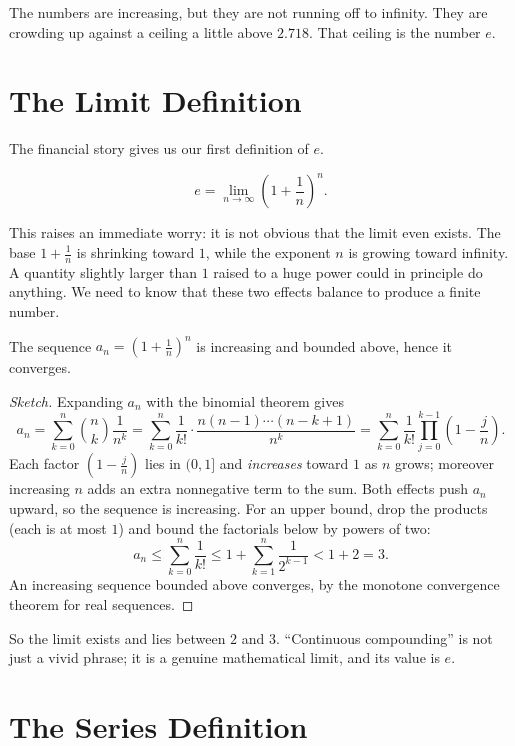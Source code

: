 \documentclass{essay}
\begin{document}
The numbers are increasing, but they are not running off to infinity. They are crowding up against a ceiling a little above $2.718$. That ceiling is the number $e$.

\section{The Limit Definition}

The financial story gives us our first definition of $e$.

\begin{definition}
\[
e = \lim_{n \to \infty} \left(1 + \frac{1}{n}\right)^n.
\]
\end{definition}

This raises an immediate worry: it is not obvious that the limit even exists. The base $1 + \tfrac{1}{n}$ is shrinking toward $1$, while the exponent $n$ is growing toward infinity. A quantity slightly larger than $1$ raised to a huge power could in principle do anything. We need to know that these two effects balance to produce a finite number.

\begin{proposition}
The sequence $a_n = \left(1 + \tfrac{1}{n}\right)^n$ is increasing and bounded above, hence it converges.
\end{proposition}

\begin{proof}[Sketch]
Expanding $a_n$ with the binomial theorem gives
\[
a_n = \sum_{k=0}^{n} \binom{n}{k}\frac{1}{n^k}
    = \sum_{k=0}^{n} \frac{1}{k!}\cdot\frac{n(n-1)\cdots(n-k+1)}{n^k}
    = \sum_{k=0}^{n} \frac{1}{k!}\prod_{j=0}^{k-1}\left(1 - \frac{j}{n}\right).
\]
Each factor $\left(1 - \tfrac{j}{n}\right)$ lies in $(0,1]$ and \emph{increases} toward $1$ as $n$ grows; moreover increasing $n$ adds an extra nonnegative term to the sum. Both effects push $a_n$ upward, so the sequence is increasing. For an upper bound, drop the products (each is at most $1$) and bound the factorials below by powers of two:
\[
a_n \le \sum_{k=0}^{n}\frac{1}{k!}
   \le 1 + \sum_{k=1}^{n}\frac{1}{2^{k-1}}
   < 1 + 2 = 3.
\]
An increasing sequence bounded above converges, by the monotone convergence theorem for real sequences.
\end{proof}

So the limit exists and lies between $2$ and $3$. ``Continuous compounding'' is not just a vivid phrase; it is a genuine mathematical limit, and its value is $e$.

\section{The Series Definition}
\end{document}
